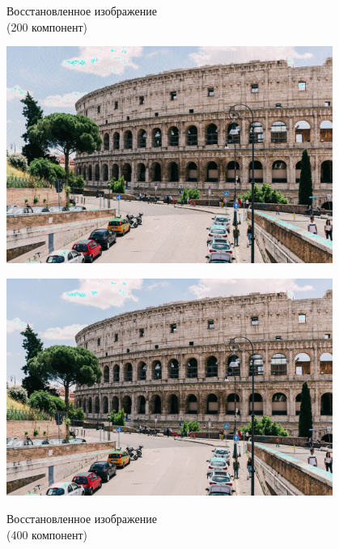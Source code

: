 \documentclass[a4paper]{article}
\begin{document}
\begin{figure}[H]
\centering
    \begin{minipage}{.45\textwidth}
    \caption{Восстановленное изображение \\(200 компонент)}
    \includegraphics[width = 0.95\textwidth]{reconstructions/with_200comps_Colosseum.jpg}
    \label{fig:col_200}
    \end{minipage}%
    \begin{minipage}{.45\textwidth}
      \centering
    \caption{Восстановленное изображение \\(400 компонент)}
    \includegraphics[width = 0.95\textwidth]{reconstructions/with_400comps_Colosseum.jpg}
    \label{fig:col_400}
    \end{minipage}%
\end{figure}
\end{document}
